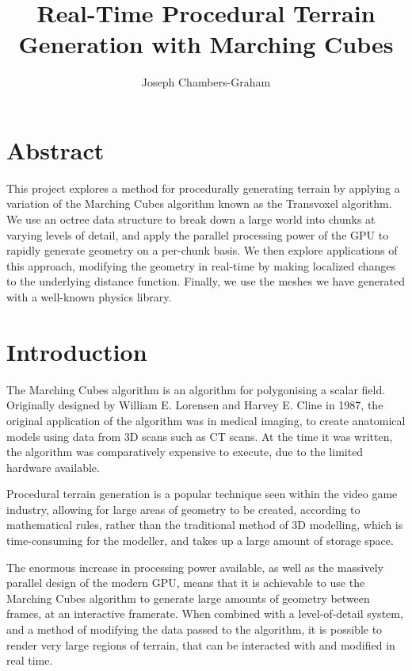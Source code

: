 \documentclass{article}
\title{Real-Time Procedural Terrain Generation with Marching Cubes}
\author{Joseph Chambers-Graham}
\date{}
\begin{document}


\maketitle
\newpage

\section*{Abstract}
This project explores a method for procedurally generating terrain by applying a variation of the Marching Cubes algorithm known as the Transvoxel algorithm. We use an octree data structure to break down a large world into chunks at varying levels of detail, and apply the parallel processing power of the GPU to rapidly generate geometry on a per-chunk basis. We then explore applications of this approach, modifying the geometry in real-time by making localized changes to the underlying distance function. %
Finally, we use the meshes we have generated with a well-known physics library.
\newpage

\tableofcontents

\newpage
\section{Introduction}


The Marching Cubes algorithm is an algorithm for polygonising a scalar field. Originally designed by William E. Lorensen and Harvey E. Cline in 1987\cite{10.1145/37402.37422}, the original application of the algorithm was in medical imaging, to create anatomical models using data from 3D scans such as CT scans. At the time it was written, the algorithm was comparatively expensive to execute, due to the limited hardware available. 
 
Procedural terrain generation is a popular technique seen within the video game industry, allowing for large areas of geometry to be created, according to mathematical rules, rather than the traditional method of 3D modelling, which is time-consuming for the modeller, and takes up a large amount of storage space.

The enormous increase in processing power available, as well as the massively parallel design of the modern GPU, means that it is achievable to use the Marching Cubes algorithm to generate large amounts of geometry between frames, at an interactive framerate. When combined with a level-of-detail system, and a method of modifying the data passed to the algorithm, it is possible to render very large regions of terrain, that can be interacted with and modified in real time.
\end{document}
